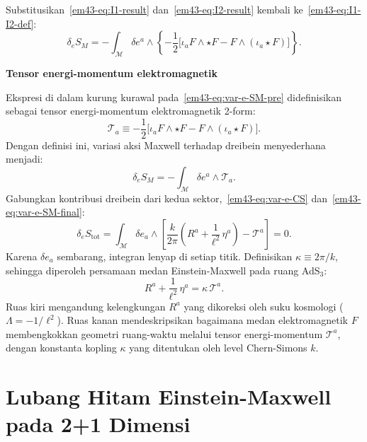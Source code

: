 Substitusikan~\eqref{em43-eq:I1-result} dan~\eqref{em43-eq:I2-result} kembali ke~\eqref{em43-eq:I1-I2-def}:
\begin{equation}\label{em43-eq:var-e-SM-pre}
    \delta_{e} S_{M}
    = -\int_{\mathcal{M}} \delta e^{a} \wedge
    \left\{-\frac{1}{2}\Big[\iota_{a} F \wedge \star F
    - F \wedge (\iota_{a}\star F)\Big]\right\}.
\end{equation}

\vspace{0.5em}
\noindent \textbf{Tensor energi-momentum elektromagnetik}

Ekspresi di dalam kurung kurawal pada~\eqref{em43-eq:var-e-SM-pre} didefinisikan sebagai tensor energi-momentum elektromagnetik 2-form:
\begin{equation}\label{em43-eq:EM-def}
    \mathcal{T}_{a}
    \equiv -\frac{1}{2}\Big[\iota_{a} F \wedge \star F
    - F \wedge (\iota_{a}\star F)\Big].
\end{equation}
Dengan definisi ini, variasi aksi Maxwell terhadap dreibein menyederhana menjadi:
\begin{equation}\label{em43-eq:var-e-SM-final}
    \delta_{e} S_{M}
    = -\int_{\mathcal{M}} \delta e^{a} \wedge \mathcal{T}_{a}.
\end{equation}
Gabungkan kontribusi dreibein dari kedua sektor,~\eqref{em43-eq:var-e-CS} dan~\eqref{em43-eq:var-e-SM-final}:
\begin{equation}
    \delta_{e} S_{\mathrm{tot}}
    = \int_{\mathcal{M}} \delta e_{a} \wedge
    \left[\frac{k}{2\pi}\left(R^{a}
    + \frac{1}{\ell^{2}}\, \eta^{a}\right)
    - \mathcal{T}^{a}\right] = 0.
\end{equation}
Karena $\delta e_{a}$ sembarang, integran lenyap di setiap titik. Definisikan $\kappa \equiv 2\pi/k$, sehingga diperoleh persamaan medan Einstein-Maxwell pada ruang AdS$_3$:
\begin{equation}\label{em43-eq:eq-einstein}
    R^{a} + \frac{1}{\ell^{2}}\, \eta^{a}
    = \kappa\, \mathcal{T}^{a}.
\end{equation}
Ruas kiri mengandung kelengkungan $R^{a}$ yang dikoreksi oleh suku kosmologi ($\Lambda = -1/\ell^{2}$). Ruas kanan mendeskripsikan bagaimana medan elektromagnetik $F$ membengkokkan geometri ruang-waktu melalui tensor energi-momentum $\mathcal{T}^{a}$, dengan konstanta kopling $\kappa$ yang ditentukan oleh level Chern-Simons $k$.

\section{Lubang Hitam Einstein-Maxwell pada 2+1 Dimensi}
\label{sec:b4-maxwell}

